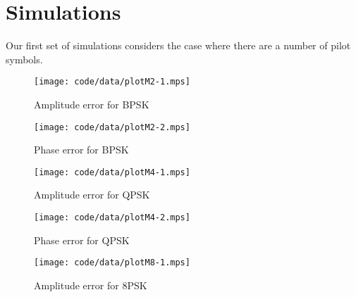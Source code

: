 \documentclass[journal]{IEEEtran}
\begin{document}
\section{Simulations}\label{sec:simulations}


Our first set of simulations considers the case where there are a number of pilot symbols.

\begin{figure}[tp]
	\centering
		\texttt{[image: code/data/plotM2-1.mps]}
		\caption{Amplitude error for BPSK}
		\label{fig:plotamp}
\end{figure}


\begin{figure}[tp]
	\centering
		\texttt{[image: code/data/plotM2-2.mps]}
		\caption{Phase error for BPSK}
		\label{fig:plotphase}
\end{figure}


\begin{figure}[tp]
	\centering
		\texttt{[image: code/data/plotM4-1.mps]}
		\caption{Amplitude error for QPSK}
		\label{fig:plotamp}
\end{figure}


\begin{figure}[tp]
	\centering
		\texttt{[image: code/data/plotM4-2.mps]}
		\caption{Phase error for QPSK}
		\label{fig:plotphase}
\end{figure}


\begin{figure}[tp]
	\centering
		\texttt{[image: code/data/plotM8-1.mps]}
		\caption{Amplitude error for 8PSK}
		\label{fig:plotamp}
\end{figure}
\end{document}
